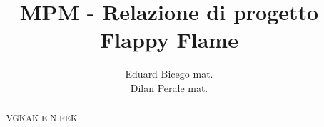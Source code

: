 \documentclass[]{article}
\title{\Large MPM - Relazione di progetto \\ \Huge \textbf{Flappy Flame}}
\author{Eduard Bicego \quad mat. \\ Dilan Perale \quad mat.}
\begin{document}
\maketitle

\begin{abstract}
	VGKAK E N FEK
\end{abstract}

\newpage





\end{document}
